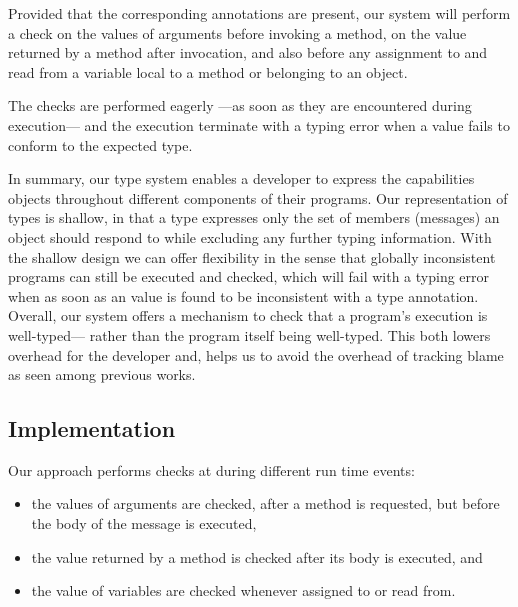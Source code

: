 Provided that the corresponding annotations are present, 
our system will perform a check
on the values of arguments before invoking a method, 
on the value returned by a method after invocation, and
also before any assignment to and read from a variable local to
a method or belonging to an object. 

The checks are performed eagerly%
---as soon as they are encountered during execution---%
and the execution terminate with a typing error 
when a value fails to conform to the expected type.

In summary, our type system enables a developer to express
the capabilities objects throughout different components of 
their programs.
Our representation of types is shallow,
in that a type expresses only the set of members (messages) an object
should respond to while excluding any further typing information. 
With the shallow design we can offer flexibility in the sense that
globally inconsistent programs can still be executed and checked,
which will fail with a typing error when as soon as an value is found
to be inconsistent with a type annotation. 
Overall, our system offers a mechanism to check that a program's execution
is well-typed---%
rather than the program itself being well-typed.
This both lowers overhead for the developer and, 
helps us to avoid the overhead of tracking blame 
as seen among previous works.

\subsection{Implementation} 
\label{ssec:implementation} 





Our approach performs checks at during different run time events:

\begin{itemize}
\item the values of arguments are checked, after a method is requested, 
      but before the body of the message is executed,
\item the value returned by a method is checked after its body is executed, and
\item the value of variables are checked whenever assigned to or read from.
\end{itemize}

